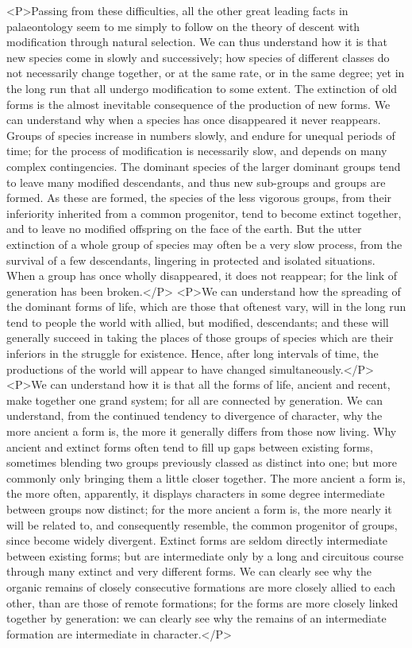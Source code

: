<P>Passing from these difficulties, all the other great leading facts in palaeontology seem to me simply to follow on the theory of descent with modification through natural selection.  We can thus understand how it is that new species come in slowly and successively; how species of different classes do not necessarily change together, or at the same rate, or in the same degree; yet in the long run that all undergo modification to some extent. The extinction of old forms is the almost inevitable consequence of the production of new forms. We can understand why when a species has once disappeared it never reappears. Groups of species increase in numbers slowly, and endure for unequal periods of time; for the process of modification is necessarily slow, and depends on many complex contingencies.  The dominant species of the larger dominant groups tend to leave many modified descendants, and thus new sub-groups and groups are formed. As these are formed, the species of the less vigorous groups, from their inferiority inherited from a common progenitor, tend to become extinct together, and to leave no modified offspring on the face of the earth. But the utter extinction of a whole group of species may often be a very slow process, from the survival of a few descendants, lingering in protected and isolated situations.  When a group has once wholly disappeared, it does not reappear; for the link of generation has been broken.</P>
<P>We can understand how the spreading of the dominant forms of life, which are those that oftenest vary, will in the long run tend to people the world with allied, but modified, descendants; and these will generally succeed in taking the places of those groups of species which are their inferiors in the struggle for existence. Hence, after long intervals of time, the productions of the world will appear to have changed simultaneously.</P>
<P>We can understand how it is that all the forms of life, ancient and recent, make together one grand system; for all are connected by generation. We can understand, from the continued tendency to divergence of character, why the more ancient a form is, the more it generally differs from those now living. Why ancient and extinct forms often tend to fill up gaps between existing forms, sometimes blending two groups previously classed as distinct into one; but more commonly only bringing them a little closer together. The more ancient a form is, the more often, apparently, it displays characters in some degree intermediate between groups now distinct; for the more ancient a form is, the more nearly it will be related to, and consequently resemble, the common progenitor of groups, since become widely divergent. Extinct forms are seldom directly intermediate between existing forms; but are intermediate only by a long and circuitous course through many extinct and very different forms. We can clearly see why the organic remains of closely consecutive formations are more closely allied to each other, than are those of remote formations; for the forms are more closely linked together by generation: we can clearly see why the remains of an intermediate formation are intermediate in character.</P>
